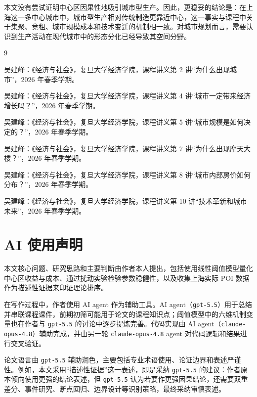 \documentclass[aps,prl,reprint,superscriptaddress,floatfix,nofootinbib,longbibliography,amsmath,amssymb]{revtex4-2}
\begin{document}
本文没有尝试证明中心区因果性地吸引城市型生产。因此，更稳妥的结论是：在上海这一多中心城市中，城市型生产相对传统制造更靠近中心，这一事实与课程中关于集聚、竞租、城市规模成本和技术变迁的机制相一致。对城市规划而言，需要认识到生产活动在现代城市中的形态分化已经导致其空间分野。

\begin{thebibliography}{9}

吴建峰：《经济与社会》，复旦大学经济学院，课程讲义第 2 讲``为什么出现城市''，2026 年春季学期。

吴建峰：《经济与社会》，复旦大学经济学院，课程讲义第 4 讲``城市一定带来经济增长吗？''，2026 年春季学期。

吴建峰：《经济与社会》，复旦大学经济学院，课程讲义第 5 讲``城市规模是如何决定的？''，2026 年春季学期。

吴建峰：《经济与社会》，复旦大学经济学院，课程讲义第 7 讲``为什么出现摩天大楼？''，2026 年春季学期。

吴建峰：《经济与社会》，复旦大学经济学院，课程讲义第 8 讲``城市内部房价如何分布？''，2026 年春季学期。

吴建峰：《经济与社会》，复旦大学经济学院，课程讲义第 10 讲``技术革新和城市未来''，2026 年春季学期。

\end{thebibliography}

\section*{AI 使用声明}

本文核心问题、研究思路和主要判断由作者本人提出，包括使用线性阈值模型量化中心区收益与成本、通过扰动实验检验参数稳健性，以及收集上海实际 POI 数据作为描述性证据来印证理论排序。

在写作过程中，作者使用 AI agent 作为辅助工具。AI agent（\texttt{gpt-5.5}）用于总结并串联课程课件，前期初筛可能用于论文的课程知识点；阈值模型中的六维机制变量也在作者与 \texttt{gpt-5.5} 的讨论中逐步提炼完善。代码实现由 AI agent（\texttt{claude-opus-4.8}）辅助完成，并由另一轮 \texttt{claude-opus-4.8} agent 对代码逻辑和结果进行交叉验证。

论文语言由 \texttt{gpt-5.5} 辅助润色，主要包括专业术语使用、论证边界和表述严谨性。例如，本文采用``描述性证据''这一表述，即是采纳 \texttt{gpt-5.5} 的建议：作者原本倾向使用更强的结论表述，但 \texttt{gpt-5.5} 认为若要作更强因果结论，还需要双重差分、事件研究、断点回归、边界设计等识别策略，最终采纳审慎表述。
\end{document}
